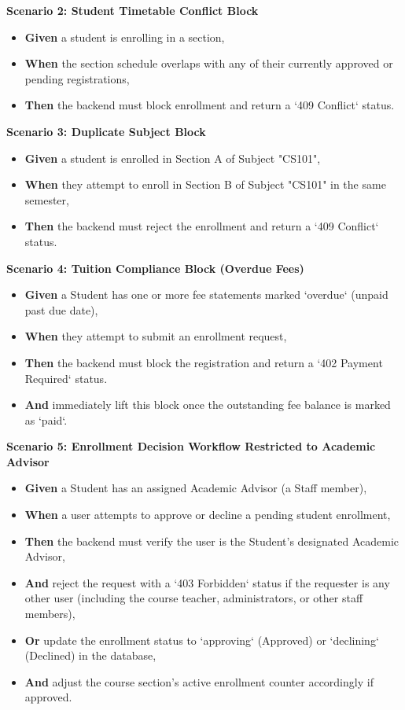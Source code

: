 \noindent\textbf{Scenario 2: Student Timetable Conflict Block}\\
\begin{itemize}
  \item \textbf{Given} a student is enrolling in a section,
  \item \textbf{When} the section schedule overlaps with any of their currently approved or pending registrations,
  \item \textbf{Then} the backend must block enrollment and return a `409 Conflict` status.
\end{itemize}


\noindent\textbf{Scenario 3: Duplicate Subject Block}\\
\begin{itemize}
  \item \textbf{Given} a student is enrolled in Section A of Subject "CS101",
  \item \textbf{When} they attempt to enroll in Section B of Subject "CS101" in the same semester,
  \item \textbf{Then} the backend must reject the enrollment and return a `409 Conflict` status.
\end{itemize}


\noindent\textbf{Scenario 4: Tuition Compliance Block (Overdue Fees)}\\
\begin{itemize}
  \item \textbf{Given} a Student has one or more fee statements marked `overdue` (unpaid past due date),
  \item \textbf{When} they attempt to submit an enrollment request,
  \item \textbf{Then} the backend must block the registration and return a `402 Payment Required` status.
  \item \textbf{And} immediately lift this block once the outstanding fee balance is marked as `paid`.
\end{itemize}


\noindent\textbf{Scenario 5: Enrollment Decision Workflow Restricted to Academic Advisor}\\
\begin{itemize}
  \item \textbf{Given} a Student has an assigned Academic Advisor (a Staff member),
  \item \textbf{When} a user attempts to approve or decline a pending student enrollment,
  \item \textbf{Then} the backend must verify the user is the Student's designated Academic Advisor,
  \item \textbf{And} reject the request with a `403 Forbidden` status if the requester is any other user (including the course teacher, administrators, or other staff members),
  \item \textbf{Or} update the enrollment status to `approving` (Approved) or `declining` (Declined) in the database,
  \item \textbf{And} adjust the course section's active enrollment counter accordingly if approved.
\end{itemize}


